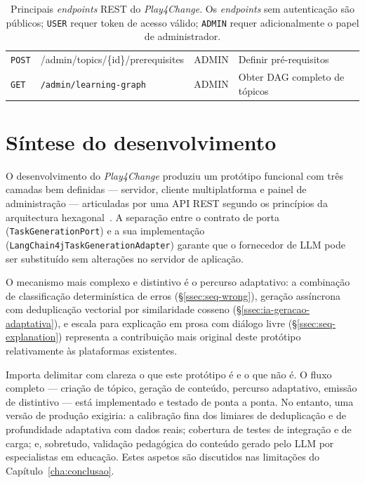 \begin{table}[htbp]
\begin{tabular}{p{1.5cm} p{6.0cm} p{1.3cm} p{3.8cm}}
		\texttt{POST}  & {\ttfamily /admin/\allowbreak topics/\allowbreak\{id\}/\allowbreak prerequisites} & ADMIN & Definir pr\'e-requisitos \\
		\texttt{GET}   & \texttt{/admin/learning-graph}                   & ADMIN & Obter DAG completo de t\'opicos \\
		\bottomrule
	\end{tabular}
	\caption[Principais \emph{endpoints} REST do \emph{Play4Change}]{Principais \emph{endpoints} REST do \emph{Play4Change}. Os \emph{endpoints} sem autentica\c{c}\~ao s\~ao p\'ublicos; \texttt{USER} requer token de acesso v\'alido; \texttt{ADMIN} requer adicionalmente o papel de administrador.}
	\label{tab:api-endpoints}
\end{table}

\section{S\'intese do desenvolvimento}
\label{sec:sintese-desenvolvimento}

\begin{sloppypar}
O desenvolvimento do \emph{Play4Change} produziu um prot\'otipo funcional com
tr\^es camadas bem definidas --- servidor, cliente multiplatforma e painel de
administra\c{c}\~ao --- articuladas por uma API REST segundo os princ\'ipios da
arquitectura hexagonal~\cite{cockburn2005hexagonal}. A separa\c{c}\~ao entre o
contrato de porta (\texttt{TaskGenerationPort}) e a sua implementa\c{c}\~ao
(\texttt{LangChain4jTaskGenerationAdapter}) garante que o fornecedor de LLM
pode ser substitu\'ido sem altera\c{c}\~oes no servidor de aplica\c{c}\~ao.
\end{sloppypar}

O mecanismo mais complexo e distintivo \'e o percurso adaptativo: a
combina\c{c}\~ao de classifica\c{c}\~ao determin\'istica de erros
(\S\ref{ssec:seq-wrong}), gera\c{c}\~ao ass\'incrona com deduplica\c{c}\~ao
vectorial por similaridade cosseno (\S\ref{ssec:ia-geracao-adaptativa}), e
escala para explica\c{c}\~ao em prosa com di\'alogo livre
(\S\ref{ssec:seq-explanation}) representa a contribui\c{c}\~ao mais original
deste prot\'otipo relativamente \`as plataformas existentes.

Importa delimitar com clareza o que este prot\'otipo \'e e o que n\~ao \'e.
O fluxo completo --- cria\c{c}\~ao de t\'opico, gera\c{c}\~ao de conte\'udo,
percurso adaptativo, emiss\~ao de distintivo --- est\'a implementado e
testado de ponta a ponta. No entanto, uma vers\~ao de produ\c{c}\~ao exigiria:
a calibra\c{c}\~ao fina dos limiares de deduplica\c{c}\~ao e de profundidade
adaptativa com dados reais; cobertura de testes de integra\c{c}\~ao e de carga;
e, sobretudo, valida\c{c}\~ao pedag\'ogica do conte\'udo gerado pelo LLM por
especialistas em educa\c{c}\~ao. Estes aspetos s\~ao discutidos nas limita\c{c}\~oes
do Cap\'itulo~\ref{cha:conclusao}.
